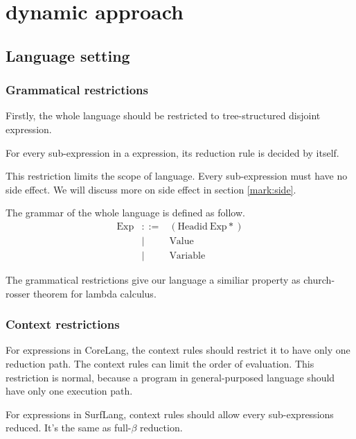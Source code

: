 
\section{dynamic approach}
\label{sec3}

\subsection{Language setting}

\subsubsection{Grammatical restrictions}
Firstly, the whole language should be restricted to tree-structured disjoint expression.

\begin{Def}[disjoint]
For every sub-expression in a expression, its reduction rule is decided by itself.
\end{Def}

This restriction limits the scope of language. Every sub-expression must have no side effect. We will discuss more on side effect in section \ref{mark:side}.

\begin{Def}
The grammar of the whole language is defined as follow.
\[
\begin{array}{rcl}
\mbox{Exp} &::=& (\mbox{Headid}~\mbox{Exp}*)\\
&|& \mbox{Value}\\
&|& \mbox{Variable}
\end{array}
\]
\end{Def}

The grammatical restrictions give our language a similiar property as church-rosser theorem\cite{churchrosser} for lambda calculus. 

\subsubsection{Context restrictions}
For expressions in CoreLang, the context rules should restrict it to have only one reduction path. The context rules can limit the order of evaluation. This restriction is normal, because a program in general-purposed language should have only one execution path.\label{mark:ctx}

For expressions in SurfLang, context rules should allow every sub-expressions reduced. It's the same as full-$\beta$ reduction.

